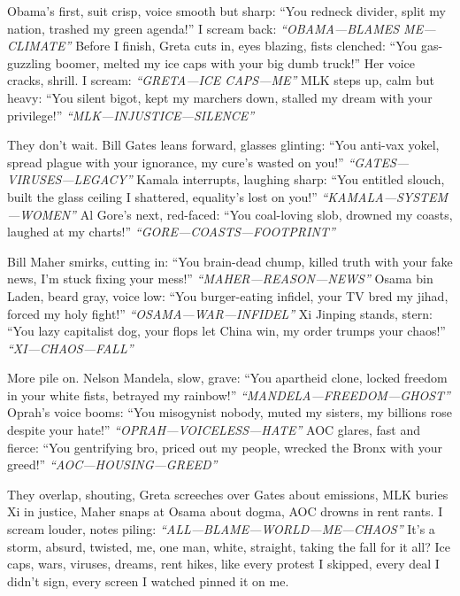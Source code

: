 \documentclass[12pt]{article} %
\begin{document}
\textnormal{Obama}’s first, suit crisp, voice smooth but sharp: “You redneck divider, split my nation, trashed my green agenda!” I scream back: \textit{“OBAMA—BLAMES ME—CLIMATE”} Before I finish, \textnormal{Greta} cuts in, eyes blazing, fists clenched: “You gas-guzzling boomer, melted my ice caps with your big dumb truck!” Her voice cracks, shrill. I scream: \textit{“GRETA—ICE CAPS—ME”} \textnormal{MLK} steps up, calm but heavy: “You silent bigot, kept my marchers down, stalled my dream with your privilege!” \textit{“MLK—INJUSTICE—SILENCE”}

They don’t wait. \textnormal{Bill Gates} leans forward, glasses glinting: “You anti-vax yokel, spread plague with your ignorance, my cure’s wasted on you!” \textit{“GATES—VIRUSES—LEGACY”} \textnormal{Kamala} interrupts, laughing sharp: “You entitled slouch, built the glass ceiling I shattered, equality’s lost on you!” \textit{“KAMALA—SYSTEM—WOMEN”} \textnormal{Al Gore}’s next, red-faced: “You coal-loving slob, drowned my coasts, laughed at my charts!” \textit{“GORE—COASTS—FOOTPRINT”}

\textnormal{Bill Maher} smirks, cutting in: “You brain-dead chump, killed truth with your fake news, I’m stuck fixing your mess!” \textit{“MAHER—REASON—NEWS”} \textnormal{Osama bin Laden}, beard gray, voice low: “You burger-eating infidel, your TV bred my jihad, forced my holy fight!” \textit{“OSAMA—WAR—INFIDEL”} \textnormal{Xi Jinping} stands, stern: “You lazy capitalist dog, your flops let China win, my order trumps your chaos!” \textit{“XI—CHAOS—FALL”}

More pile on. \textnormal{Nelson Mandela}, slow, grave: “You apartheid clone, locked freedom in your white fists, betrayed my rainbow!” \textit{“MANDELA—FREEDOM—GHOST”} \textnormal{Oprah}’s voice booms: “You misogynist nobody, muted my sisters, my billions rose despite your hate!” \textit{“OPRAH—VOICELESS—HATE”} \textnormal{AOC} glares, fast and fierce: “You gentrifying bro, priced out my people, wrecked the Bronx with your greed!” \textit{“AOC—HOUSING—GREED”}

They overlap, shouting, \textnormal{Greta} screeches over \textnormal{Gates} about emissions, \textnormal{MLK} buries \textnormal{Xi} in justice, \textnormal{Maher} snaps at \textnormal{Osama} about dogma, \textnormal{AOC} drowns in rent rants. I scream louder, notes piling: \textit{“ALL—BLAME—WORLD—ME—CHAOS”} It’s a storm, absurd, twisted, me, one man, white, straight, taking the fall for it all? Ice caps, wars, viruses, dreams, rent hikes, like every protest I skipped, every deal I didn’t sign, every screen I watched pinned it on me.
\end{document}
